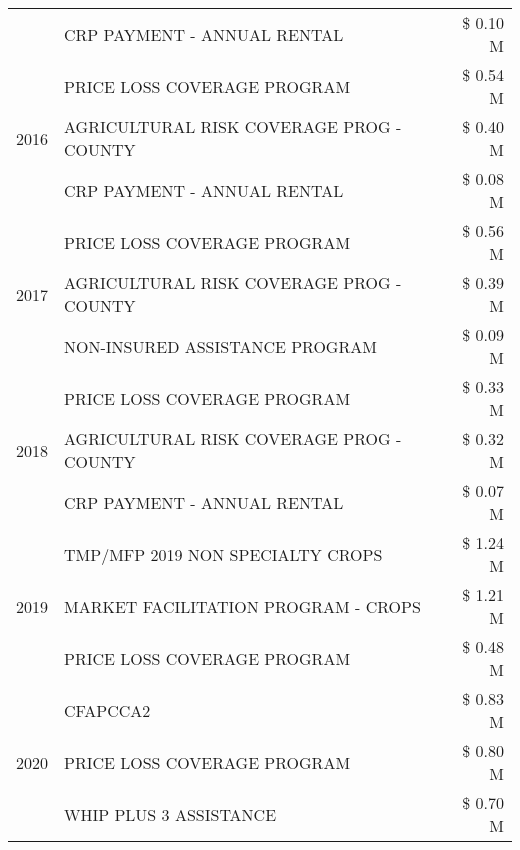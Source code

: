 \begin{tabular}{llr}
 & CRP PAYMENT - ANNUAL RENTAL & \$ 0.10 M \\
\cline{1-3}
\multirow[t]{3}{*}{2016} & PRICE LOSS COVERAGE PROGRAM & \$ 0.54 M \\
 & AGRICULTURAL RISK COVERAGE PROG - COUNTY & \$ 0.40 M \\
 & CRP PAYMENT - ANNUAL RENTAL & \$ 0.08 M \\
\cline{1-3}
\multirow[t]{3}{*}{2017} & PRICE LOSS COVERAGE PROGRAM & \$ 0.56 M \\
 & AGRICULTURAL RISK COVERAGE PROG - COUNTY & \$ 0.39 M \\
 & NON-INSURED ASSISTANCE PROGRAM & \$ 0.09 M \\
\cline{1-3}
\multirow[t]{3}{*}{2018} & PRICE LOSS COVERAGE PROGRAM & \$ 0.33 M \\
 & AGRICULTURAL RISK COVERAGE PROG - COUNTY & \$ 0.32 M \\
 & CRP PAYMENT - ANNUAL RENTAL & \$ 0.07 M \\
\cline{1-3}
\multirow[t]{3}{*}{2019} & TMP/MFP 2019 NON SPECIALTY CROPS & \$ 1.24 M \\
 & MARKET FACILITATION PROGRAM - CROPS & \$ 1.21 M \\
 & PRICE LOSS COVERAGE PROGRAM & \$ 0.48 M \\
\cline{1-3}
\multirow[t]{3}{*}{2020} & CFAPCCA2 & \$ 0.83 M \\
 & PRICE LOSS COVERAGE PROGRAM & \$ 0.80 M \\
 & WHIP PLUS 3 ASSISTANCE & \$ 0.70 M \\
\cline{1-3}
\bottomrule
\end{tabular}
